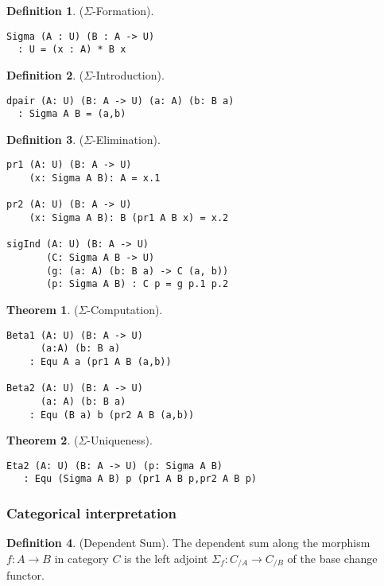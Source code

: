 \documentclass[twocolumn,10pt]{article}
\theoremstyle{definition}
\newtheorem{theorem}{Theorem}
\newtheorem{definition}{Definition}
\begin{document}
\begin{definition} ($\Sigma$-Formation).
\begin{lstlisting}
Sigma (A : U) (B : A -> U)
  : U = (x : A) * B x
\end{lstlisting}
\end{definition}

\begin{definition} ($\Sigma$-Introduction).
\begin{lstlisting}
dpair (A: U) (B: A -> U) (a: A) (b: B a)
  : Sigma A B = (a,b)
\end{lstlisting}
\end{definition}

\begin{definition} ($\Sigma$-Elimination).
\begin{lstlisting}
pr1 (A: U) (B: A -> U)
    (x: Sigma A B): A = x.1

pr2 (A: U) (B: A -> U)
    (x: Sigma A B): B (pr1 A B x) = x.2

sigInd (A: U) (B: A -> U)
       (C: Sigma A B -> U)
       (g: (a: A) (b: B a) -> C (a, b))
       (p: Sigma A B) : C p = g p.1 p.2
\end{lstlisting}
\end{definition}

\begin{theorem} ($\Sigma$-Computation).
\begin{lstlisting}
Beta1 (A: U) (B: A -> U)
      (a:A) (b: B a)
    : Equ A a (pr1 A B (a,b))

Beta2 (A: U) (B: A -> U)
      (a: A) (b: B a)
    : Equ (B a) b (pr2 A B (a,b))
\end{lstlisting}
\end{theorem}

\begin{theorem} ($\Sigma$-Uniqueness).
\begin{lstlisting}
Eta2 (A: U) (B: A -> U) (p: Sigma A B)
   : Equ (Sigma A B) p (pr1 A B p,pr2 A B p)
\end{lstlisting}
\end{theorem}

\subsubsection*{Categorical interpretation}

\begin{definition} (Dependent Sum).
The dependent sum along the morphism $f: A \rightarrow B$ in category $C$ is the left
adjoint $\Sigma_f : C_{/A} \rightarrow C_{/B}$ of the base change functor.
\end{definition}
\end{document}
